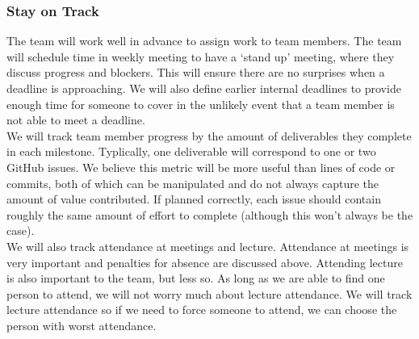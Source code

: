\documentclass{article}
\begin{document}
\subsubsection*{Stay on Track}

The team will work well in advance to assign work to team members. The team will schedule time in weekly meeting to have a `stand up' meeting, where they
discuss progress and blockers. This will ensure there are no surprises when a deadline is approaching. We will also define earlier internal deadlines to provide enough
time for someone to cover in the unlikely event that a team member is not able to meet a deadline.\\

We will track team member progress by the amount of deliverables they complete in each milestone. Typlically, one deliverable will correspond to one or two 
GitHub issues. We believe this metric will be more useful than lines of code or commits, both of which can be manipulated and do not always capture the 
amount of value contributed. If planned correctly, each issue should contain roughly the same amount of effort to complete (although this won't always be the case).\\

We will also track attendance at meetings and lecture. Attendance at meetings is very important and penalties for absence are discussed above. Attending lecture is
also important to the team, but less so. As long as we are able to find one person to attend, we will not worry much about lecture attendance. We will 
track lecture attendance so if we need to force someone to attend, we can choose the person with worst attendance.



\end{document}
